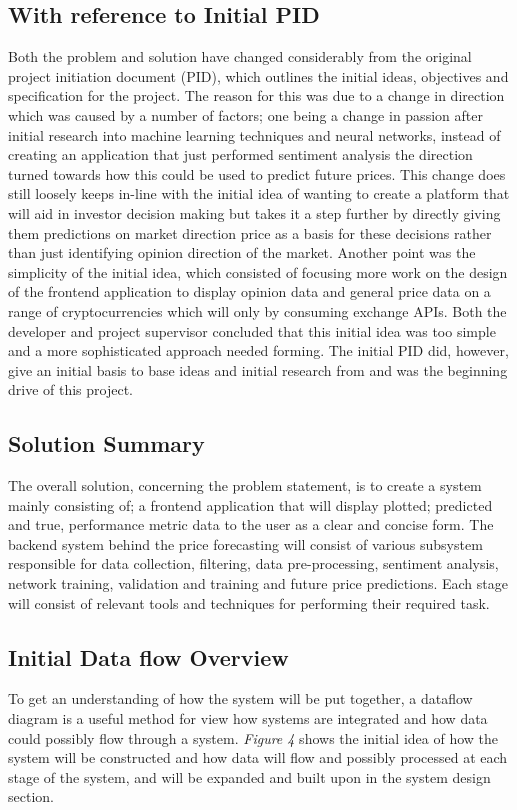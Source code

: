 \documentclass[oneside, 12pt]{article}
\begin{document}
		\subsection{With reference to Initial PID}
		Both the problem and solution have changed considerably from the original project initiation document (PID), which outlines the initial ideas, objectives and specification for the project. The reason for this was due to a change in direction which was caused by a number of factors; one being a change in passion after initial research into machine learning techniques and neural networks, instead of creating an application that just performed sentiment analysis the direction turned towards how this could be used to predict future prices. This change does still loosely keeps in-line with the initial idea of wanting to create a platform that will aid in investor decision making but takes it a step further by directly giving them predictions on market direction price as a basis for these decisions rather than just identifying opinion direction of the market. 
		Another point was the simplicity of the initial idea, which consisted of focusing more work on the design of the frontend application to display opinion data and general price data on a range of cryptocurrencies which will only by consuming exchange APIs. Both the developer and project supervisor concluded that this initial idea was too simple and a more sophisticated approach needed forming.
		The initial PID did, however, give an initial basis to base ideas and initial research from and was the beginning drive of this project.
		
		\subsection{Solution Summary}\label{summary}
		The overall solution, concerning the problem statement, is to create a system mainly consisting of; a frontend application that will display plotted; predicted and true, performance metric data to the user as a clear and concise form. The backend system behind the price forecasting will consist of various subsystem responsible for data collection, filtering, data pre-processing, sentiment analysis, network training, validation and training and future price predictions. Each stage will consist of relevant tools and techniques for performing their required task.
		
		\newpage
		
		\subsection{Initial Data flow Overview}\label{data-flow}
		To get an understanding of how the system will be put together, a dataflow diagram is a useful method for view how systems are integrated and how data could possibly flow through a system. \textit{Figure 4} shows the initial idea of how the system will be constructed and how data will flow and possibly processed at each stage of the system, and will be expanded and built upon in the system design section.
		
\end{document}
